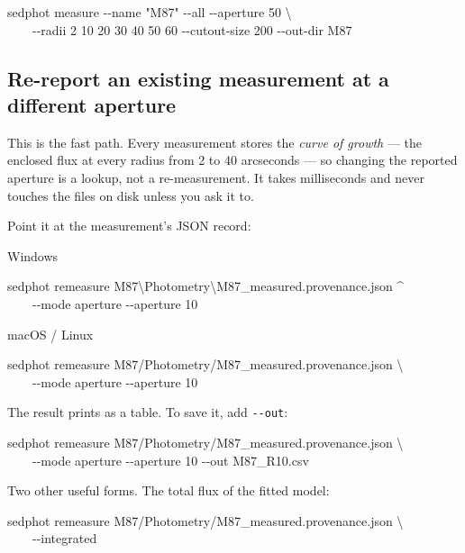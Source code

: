 \documentclass[11pt]{article}
\begin{document}
\begin{cmd}\ttfamily\frenchspacing
sedphot measure -{}-name "M87" -{}-all -{}-aperture 50 \textbackslash\\
\mbox{}~~~~-{}-radii 2 10 20 30 40 50 60 -{}-cutout-size 200 -{}-out-dir M87
\end{cmd}

\subsection{Re-report an existing measurement at a different aperture}

This is the fast path. Every measurement stores the \emph{curve of growth}
--- the enclosed flux at every radius from 2 to 40 arcseconds --- so
changing the reported aperture is a lookup, not a re-measurement. It takes
milliseconds and never touches the files on disk unless you ask it to.

Point it at the measurement's JSON record:

Windows

\begin{cmd}\ttfamily\frenchspacing
sedphot remeasure M87\textbackslash Photometry\textbackslash M87\_measured.provenance.json \textasciicircum\\
\mbox{}~~~~-{}-mode aperture -{}-aperture 10
\end{cmd}

macOS / Linux

\begin{cmd}\ttfamily\frenchspacing
sedphot remeasure M87/Photometry/M87\_measured.provenance.json \textbackslash\\
\mbox{}~~~~-{}-mode aperture -{}-aperture 10
\end{cmd}

The result prints as a table. To save it, add \texttt{-{}-out}:

\begin{cmd}\ttfamily\frenchspacing
sedphot remeasure M87/Photometry/M87\_measured.provenance.json \textbackslash\\
\mbox{}~~~~-{}-mode aperture -{}-aperture 10 -{}-out M87\_R10.csv
\end{cmd}

Two other useful forms. The total flux of the fitted model:

\begin{cmd}\ttfamily\frenchspacing
sedphot remeasure M87/Photometry/M87\_measured.provenance.json \textbackslash\\
\mbox{}~~~~-{}-integrated
\end{cmd}
\end{document}
